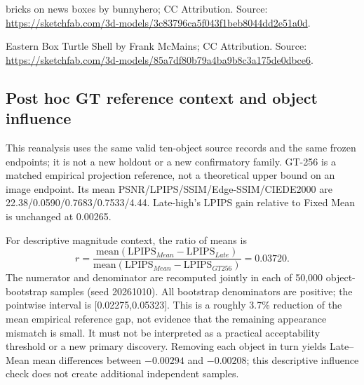 \documentclass[11pt]{article}
\begin{document}
bricks on news boxes by bunnyhero; CC Attribution. Source: \url{https://sketchfab.com/3d-models/3c83796ca5f043f1beb8044dd2e51a0d}.

Eastern Box Turtle Shell by Frank McMains; CC Attribution. Source: \url{https://sketchfab.com/3d-models/85a7df80b79a4ba9b8c3a175de0dbce6}.


\clearpage

\subsection*{Post hoc GT reference context and object influence}
This reanalysis uses the same valid ten-object source records and the same frozen endpoints; it is not a new holdout or a new confirmatory family. GT-256 is a matched empirical projection reference, not a theoretical upper bound on an image endpoint. Its mean PSNR/LPIPS/SSIM/Edge-SSIM/CIEDE2000 are 22.38/0.0590/0.7683/0.7533/4.44. Late-high's LPIPS gain relative to Fixed Mean is unchanged at 0.00265.

For descriptive magnitude context, the ratio of means is
\[
 r=\frac{\mathrm{mean}(\mathrm{LPIPS}_{Mean}-\mathrm{LPIPS}_{Late})}{\mathrm{mean}(\mathrm{LPIPS}_{Mean}-\mathrm{LPIPS}_{GT256})}=0.03720.
\]
The numerator and denominator are recomputed jointly in each of 50,000 object-bootstrap samples (seed 20261010). All bootstrap denominators are positive; the pointwise interval is [0.02275,0.05323]. This is a roughly 3.7\% reduction of the mean empirical reference gap, not evidence that the remaining appearance mismatch is small. It must not be interpreted as a practical acceptability threshold or a new primary discovery. Removing each object in turn yields Late--Mean mean differences between $-0.00294$ and $-0.00208$; this descriptive influence check does not create additional independent samples.
\end{document}
